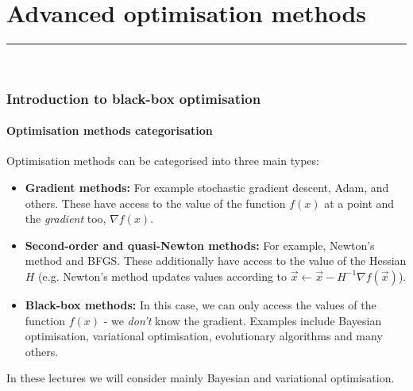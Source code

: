 \newpage
\part{Advanced optimisation methods}
\hrule
\noindent \\
\section{Introduction to black-box optimisation}

\subsection{Optimisation methods categorisation}
Optimisation methods can be categorised into three main types:
\begin{itemize}
\item \textbf{Gradient methods:} For example stochastic gradient descent, Adam, and others. These have access to the value of the function $f(x)$ at a point and the \textit{gradient} too, $\nabla f(x)$.
\item \textbf{Second-order and quasi-Newton methods:} For example, Newton's method and BFGS. These additionally have access to the value of the Hessian $H$ (e.g. Newton's method updates values according to $\vec{x} \leftarrow \vec{x} - H^{-1} \nabla f(\vec{x})$).
\item \textbf{Black-box methods:} In this case, we can only access the values of the function $f(x)$ - we \textit{don't} know the gradient. Examples include Bayesian optimisation, variational optimisation, evolutionary algorithms and many others.
\end{itemize}

In these lectures we will consider mainly Bayesian and variational optimisation. 

